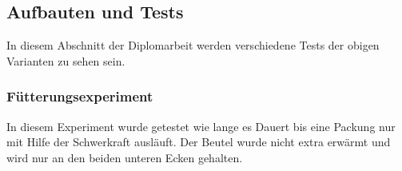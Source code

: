 \documentclass[a4paper,12pt]{scrartcl}
\begin{document}
\subsection{Aufbauten und Tests}

In diesem Abschnitt der Diplomarbeit werden verschiedene Tests der obigen Varianten zu sehen sein. \\

\subsubsection{Fütterungsexperiment} 

In diesem Experiment wurde getestet wie lange es Dauert bis eine Packung nur mit Hilfe der Schwerkraft ausläuft. Der Beutel wurde nicht extra erwärmt und wird nur an den beiden unteren Ecken gehalten.
\end{document}
